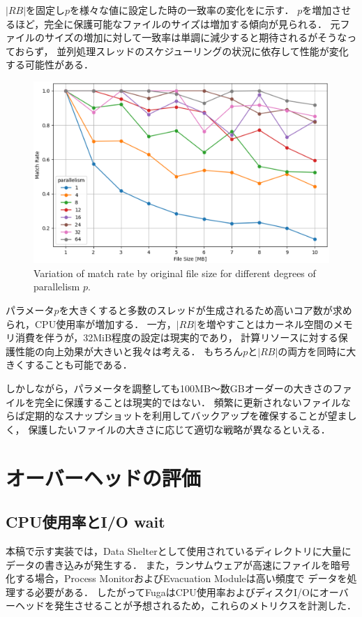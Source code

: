 $|RB|$を固定し$p$を様々な値に設定した時の一致率の変化をに示す．
$p$を増加させるほど，完全に保護可能なファイルのサイズは増加する傾向が見られる．
元ファイルのサイズの増加に対して一致率は単調に減少すると期待されるがそうなっておらず，
並列処理スレッドのスケジューリングの状況に依存して性能が変化する可能性がある．
\begin{figure}[tb]
  \centering
  \includegraphics[width=\columnwidth]{doc/img/eval/match_seek_diff_parallelism.eps}
  \caption{Variation of match rate by original file size for different degrees of parallelism $p$.}
  \label{fig:diff-parallelism}
\end{figure}

パラメータ$p$を大きくすると多数のスレッドが生成されるため高いコア数が求められ，CPU使用率が増加する．
一方，$|RB|$を増やすことはカーネル空間のメモリ消費を伴うが，32MiB程度の設定は現実的であり，
計算リソースに対する保護性能の向上効果が大きいと我々は考える．
もちろん$p$と$|RB|$の両方を同時に大きくすることも可能である．

しかしながら，パラメータを調整しても100MB〜数GBオーダーの大きさのファイルを完全に保護することは現実的ではない．
頻繁に更新されないファイルならば定期的なスナップショットを利用してバックアップを確保することが望ましく，
保護したいファイルの大きさに応じて適切な戦略が異なるといえる．

\section{オーバーヘッドの評価}
\subsection{CPU使用率とI/O wait}
本稿で示す実装では，Data Shelterとして使用されているディレクトリに大量にデータの書き込みが発生する．
また，ランサムウェアが高速にファイルを暗号化する場合，Process MonitorおよびEvacuation Moduleは高い頻度で
データを処理する必要がある．
したがってFugaはCPU使用率およびディスクI/Oにオーバーヘッドを発生させることが予想されるため，これらのメトリクスを計測した．

